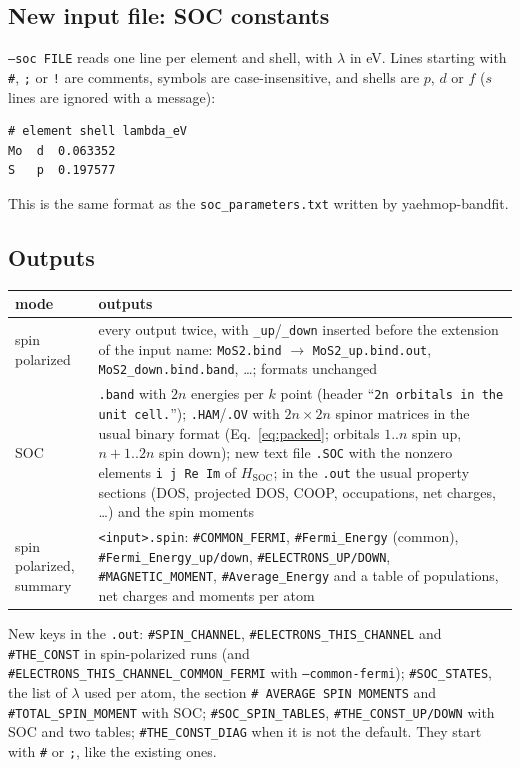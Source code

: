 \documentclass[11pt,a4paper]{article}
\newcommand{\file}[1]{\texttt{#1}}
\newcommand{\opt}[1]{\texttt{#1}}
\newcommand{\Hsoc}{H_{\mathrm{SOC}}}
\begin{document}
\subsection{New input file: SOC constants}

\opt{--soc FILE} reads one line per element and shell, with $\lambda$ in eV. Lines starting
with \texttt{\#}, \texttt{;} or \texttt{!} are comments, symbols are case-insensitive, and
shells are $p$, $d$ or $f$ ($s$ lines are ignored with a message):
\begin{lstlisting}[style=sh]
# element shell lambda_eV
Mo  d  0.063352
S   p  0.197577
\end{lstlisting}
This is the same format as the \file{soc\_parameters.txt} written by yaehmop-bandfit.

\subsection{Outputs}

\begin{center}
\begin{tabularx}{\textwidth}{l X}
\toprule
\textbf{mode} & \textbf{outputs} \\
\midrule
spin polarized & every output twice, with \texttt{\_up}/\texttt{\_down} inserted before
  the extension of the input name: \texttt{MoS2.bind} $\to$
  \texttt{MoS2\_up.bind.out}, \texttt{MoS2\_down.bind.band}, \ldots; formats unchanged \\
SOC & \texttt{.band} with $2n$ energies per $k$ point (header ``\texttt{2n orbitals in the
  unit cell.}''); \texttt{.HAM}/\texttt{.OV} with $2n\times2n$ spinor matrices in the
  usual binary format (Eq.~\eqref{eq:packed}; orbitals $1..n$ spin up, $n+1..2n$ spin
  down); new text file \texttt{.SOC} with the nonzero elements \texttt{i j Re Im} of
  $\Hsoc$; in the \texttt{.out} the usual property sections (DOS, projected DOS, COOP,
  occupations, net charges, \ldots) and the spin moments \\
spin polarized, summary & \texttt{<input>.spin}: \texttt{\#COMMON\_FERMI},
  \texttt{\#Fermi\_Energy} (common), \texttt{\#Fermi\_Energy\_up/down},
  \texttt{\#ELECTRONS\_UP/DOWN}, \texttt{\#MAGNETIC\_MOMENT}, \texttt{\#Average\_Energy}
  and a table of populations, net charges and moments per atom \\
\bottomrule
\end{tabularx}
\end{center}

New keys in the \texttt{.out}: \texttt{\#SPIN\_CHANNEL}, \texttt{\#ELECTRONS\_THIS\_CHANNEL}
and \texttt{\#THE\_CONST} in spin-polarized runs (and
\texttt{\#ELECTRONS\_THIS\_CHANNEL\_COMMON\_FERMI} with \opt{--common-fermi});
\texttt{\#SOC\_STATES}, the list of $\lambda$ used per atom, the section
\texttt{\# AVERAGE SPIN MOMENTS} and \texttt{\#TOTAL\_SPIN\_MOMENT} with SOC;
\texttt{\#SOC\_SPIN\_TABLES}, \texttt{\#THE\_CONST\_UP/DOWN} with SOC and two tables;
\texttt{\#THE\_CONST\_DIAG} when it is not the default.
They start with \texttt{\#} or \texttt{;}, like the existing ones.
\end{document}
